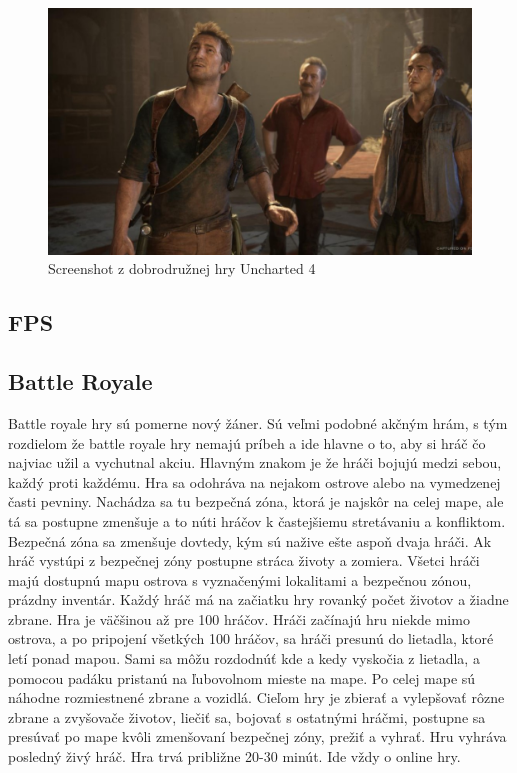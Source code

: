 \documentclass[10pt,twoside,slovak,a4paper]{coursepaper}
\begin{document}
\begin{figure}[tbh]
\centering
\includegraphics[scale=0.3]{Screenshot.jpg}
\caption{Screenshot z dobrodružnej hry Uncharted 4}
\label{f:uncharted}
\end{figure}


\subsection{FPS} \label{zanre:fps}


\subsection{Battle Royale} \label{zanre:battleroyale}

Battle royale hry sú pomerne nový žáner. Sú veľmi podobné akčným hrám, s tým rozdielom že battle royale hry nemajú príbeh a ide hlavne o to, aby si hráč čo najviac užil a vychutnal akciu. Hlavným znakom je že hráči bojujú medzi sebou, každý proti každému. Hra sa odohráva na nejakom ostrove alebo na vymedzenej časti pevniny. Nachádza sa tu bezpečná zóna, ktorá je najskôr na celej mape, ale tá sa postupne zmenšuje a to núti hráčov k častejšiemu stretávaniu a konfliktom. Bezpečná zóna sa zmenšuje dovtedy, kým sú nažive ešte aspoň dvaja hráči. Ak hráč vystúpi z bezpečnej zóny postupne stráca životy a zomiera. Všetci hráči majú dostupnú mapu ostrova s vyznačenými lokalitami a bezpečnou zónou, prázdny inventár. Každý hráč má na začiatku hry rovanký počet životov a žiadne zbrane. Hra je väčšinou až pre 100 hráčov. Hráči začínajú hru niekde mimo ostrova, a po pripojení všetkých 100 hráčov, sa hráči presunú do lietadla, ktoré letí ponad mapou. Sami sa môžu rozdodnúť kde a kedy vyskočia z lietadla, a pomocou padáku pristanú na ľubovolnom mieste na mape. Po celej mape sú náhodne rozmiestnené zbrane a vozidlá. Cieľom hry je zbierať a vylepšovať rôzne zbrane a zvyšovače životov, liečiť sa, bojovať s ostatnými hráčmi, postupne sa presúvať po mape kvôli zmenšovaní bezpečnej zóny, prežiť a vyhrať. Hru vyhráva posledný živý hráč. Hra trvá približne 20-30 minút. Ide vždy o online hry.
\end{document}
